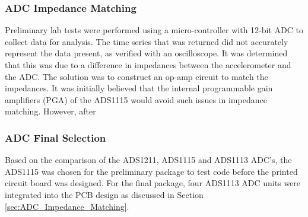 \subsubsection{ADC Impedance Matching}
Preliminary lab tests were performed using a micro-controller with 12-bit ADC to collect data for analysis.
The time series that was returned did not accurately represent the data present, as verified with an oscilloscope.
It was determined that this was due to a difference in impedances between the accelerometer and the ADC.
The solution was to construct an op-amp circuit to match the impedances.
It was initially believed that the internal programmable gain amplifiers (PGA) of the ADS1115 would avoid such issues in impedance matching.
However, after 

\subsubsection{ADC Final Selection}
\indent Based on the comparison of the ADS1211, ADS1115 and ADS1113 ADC's, the ADS1115 was chosen for the preliminary package to test code before the printed circuit board was designed.
For the final package, four ADS1113 ADC units were integrated into the PCB design as discussed in Section \ref{sec:ADC_Impedance_Matching}. 
